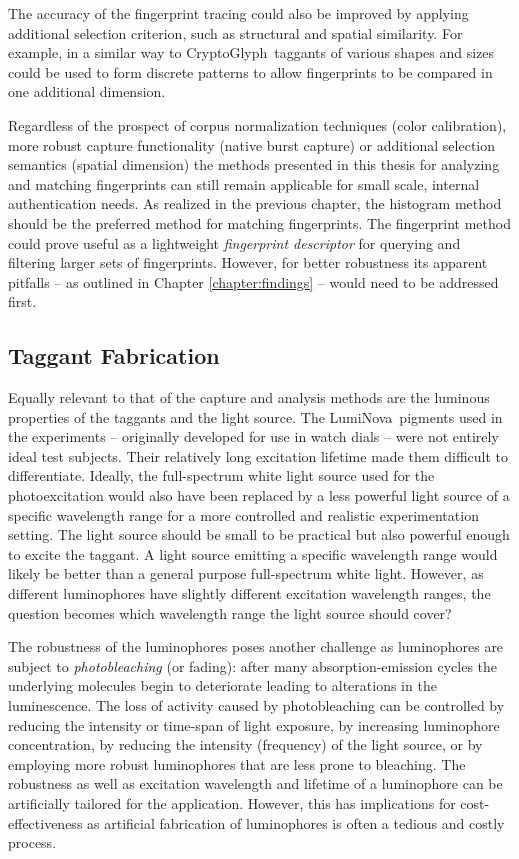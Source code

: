 \documentclass[thesis.tex]{subfiles}
\begin{document}
The accuracy of the fingerprint tracing could also be improved by applying additional selection criterion, such as structural and spatial similarity. For example, in a similar way to CryptoGlyph\textregistered\ taggants of various shapes and sizes could be used to form discrete patterns to allow fingerprints to be compared in one additional dimension.

Regardless of the prospect of corpus normalization techniques (color calibration), more robust capture functionality (native burst capture) or additional selection semantics (spatial dimension) the methods presented in this thesis for analyzing and matching fingerprints can still remain applicable for small scale, internal authentication needs. As realized in the previous chapter, the histogram method should be the preferred method for matching fingerprints. The fingerprint method could prove useful as a lightweight \emph{fingerprint descriptor} for querying and filtering larger sets of fingerprints. However, for better robustness its apparent pitfalls -- as outlined in Chapter \ref{chapter:findings} -- would need to be addressed first.

\subsection{Taggant Fabrication}

Equally relevant to that of the capture and analysis methods are the luminous properties of the taggants and the light source. The LumiNova\textregistered\ pigments used in the experiments -- originally developed for use in watch dials -- were not entirely ideal test subjects. Their relatively long excitation lifetime made them difficult to differentiate. Ideally, the full-spectrum white light source used for the photoexcitation would also have been replaced by a less powerful light source of a specific wavelength range for a more controlled and realistic experimentation setting. The light source should be small to be practical but also powerful enough to excite the taggant. A light source emitting a specific wavelength range would likely be better than a general purpose full-spectrum white light. However, as different luminophores have slightly different excitation wavelength ranges, the question becomes which wavelength range the light source should cover?

The robustness of the luminophores poses another challenge as luminophores are subject to \emph{photobleaching} (or fading): after many absorption-emission cycles the underlying molecules begin to deteriorate leading to alterations in the luminescence. The loss of activity caused by photobleaching can be controlled by reducing the intensity or time-span of light exposure, by increasing luminophore concentration, by reducing the intensity (frequency) of the light source, or by employing more robust luminophores that are less prone to bleaching. The robustness as well as excitation wavelength and lifetime of a luminophore can be artificially tailored for the application. However, this has implications for cost-effectiveness as artificial fabrication of luminophores is often a tedious and costly process.
\end{document}
